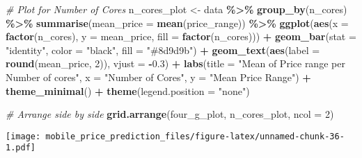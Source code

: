 \documentclass[
]{article}
\newenvironment{Shaded}{\begin{snugshade}}{\end{snugshade}}
\newcommand{\AttributeTok}[1]{\textcolor[rgb]{0.13,0.29,0.53}{#1}}
\newcommand{\CommentTok}[1]{\textcolor[rgb]{0.56,0.35,0.01}{\textit{#1}}}
\newcommand{\DecValTok}[1]{\textcolor[rgb]{0.00,0.00,0.81}{#1}}
\newcommand{\FloatTok}[1]{\textcolor[rgb]{0.00,0.00,0.81}{#1}}
\newcommand{\FunctionTok}[1]{\textcolor[rgb]{0.13,0.29,0.53}{\textbf{#1}}}
\newcommand{\NormalTok}[1]{#1}
\newcommand{\OtherTok}[1]{\textcolor[rgb]{0.56,0.35,0.01}{#1}}
\newcommand{\SpecialCharTok}[1]{\textcolor[rgb]{0.81,0.36,0.00}{\textbf{#1}}}
\newcommand{\StringTok}[1]{\textcolor[rgb]{0.31,0.60,0.02}{#1}}
\begin{document}
\begin{Shaded}
\begin{Highlighting}[]
\CommentTok{\# Plot for Number of Cores}
\NormalTok{n\_cores\_plot }\OtherTok{\textless{}{-}}\NormalTok{ data }\SpecialCharTok{\%\textgreater{}\%}
  \FunctionTok{group\_by}\NormalTok{(n\_cores) }\SpecialCharTok{\%\textgreater{}\%}
  \FunctionTok{summarise}\NormalTok{(}\AttributeTok{mean\_price =} \FunctionTok{mean}\NormalTok{(price\_range)) }\SpecialCharTok{\%\textgreater{}\%}
  \FunctionTok{ggplot}\NormalTok{(}\FunctionTok{aes}\NormalTok{(}\AttributeTok{x =} \FunctionTok{factor}\NormalTok{(n\_cores), }\AttributeTok{y =}\NormalTok{ mean\_price, }\AttributeTok{fill =} \FunctionTok{factor}\NormalTok{(n\_cores))) }\SpecialCharTok{+}
  \FunctionTok{geom\_bar}\NormalTok{(}\AttributeTok{stat =} \StringTok{"identity"}\NormalTok{, }\AttributeTok{color =} \StringTok{"black"}\NormalTok{, }\AttributeTok{fill =} \StringTok{"\#8d9d9b"}\NormalTok{) }\SpecialCharTok{+}
  \FunctionTok{geom\_text}\NormalTok{(}\FunctionTok{aes}\NormalTok{(}\AttributeTok{label =} \FunctionTok{round}\NormalTok{(mean\_price, }\DecValTok{2}\NormalTok{)), }\AttributeTok{vjust =} \SpecialCharTok{{-}}\FloatTok{0.3}\NormalTok{) }\SpecialCharTok{+}
  \FunctionTok{labs}\NormalTok{(}\AttributeTok{title =} \StringTok{"Mean of Price range per Number of cores"}\NormalTok{, }\AttributeTok{x =} \StringTok{"Number of Cores"}\NormalTok{, }\AttributeTok{y =} \StringTok{"Mean Price Range"}\NormalTok{) }\SpecialCharTok{+}
  \FunctionTok{theme\_minimal}\NormalTok{() }\SpecialCharTok{+}
  \FunctionTok{theme}\NormalTok{(}\AttributeTok{legend.position =} \StringTok{"none"}\NormalTok{)}

\CommentTok{\# Arrange side by side}
\FunctionTok{grid.arrange}\NormalTok{(four\_g\_plot, n\_cores\_plot, }\AttributeTok{ncol =} \DecValTok{2}\NormalTok{)}
\end{Highlighting}
\end{Shaded}

\texttt{[image: mobile\_price\_prediction\_files/figure-latex/unnamed-chunk-36-1.pdf]}
\end{document}

